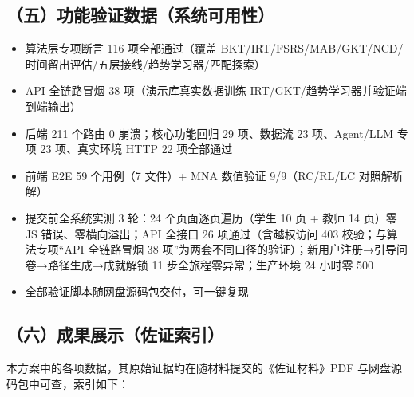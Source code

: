 \documentclass[zihao=-4,a4paper,UTF8,fontset=windows]{ctexart}
\begin{document}
\subsection{（五）功能验证数据（系统可用性）}
\begin{itemize}[leftmargin=2em,itemsep=0pt,topsep=0pt]
\item 算法层专项断言 116 项全部通过（覆盖 BKT/IRT/FSRS/MAB/GKT/NCD/时间留出评估/五层接线/趋势学习器/匹配探索）
\end{itemize}
\begin{itemize}[leftmargin=2em,itemsep=0pt,topsep=0pt]
\item API 全链路冒烟 38 项（演示库真实数据训练 IRT/GKT/趋势学习器并验证端到端输出）
\end{itemize}
\begin{itemize}[leftmargin=2em,itemsep=0pt,topsep=0pt]
\item 后端 211 个路由 0 崩溃；核心功能回归 29 项、数据流 23 项、Agent/LLM 专项 23 项、真实环境 HTTP 22 项全部通过
\end{itemize}
\begin{itemize}[leftmargin=2em,itemsep=0pt,topsep=0pt]
\item 前端 E2E 59 个用例（7 文件）+ MNA 数值验证 9/9（RC/RL/LC 对照解析解）
\end{itemize}
\begin{itemize}[leftmargin=2em,itemsep=0pt,topsep=0pt]
\item 提交前全系统实测 3 轮：24 个页面逐页遍历（学生 10 页 + 教师 14 页）零 JS 错误、零横向溢出；API 全接口 26 项通过（含越权访问 403 校验；与算法专项“API 全链路冒烟 38 项”为两套不同口径的验证）；新用户注册→引导问卷→路径生成→成就解锁 11 步全旅程零异常；生产环境 24 小时零 500
\end{itemize}
\begin{itemize}[leftmargin=2em,itemsep=0pt,topsep=0pt]
\item 全部验证脚本随网盘源码包交付，可一键复现
\end{itemize}
\subsection{（六）成果展示（佐证索引）}

本方案中的各项数据，其原始证据均在随材料提交的《佐证材料》PDF 与网盘源码包中可查，索引如下：
\end{document}
